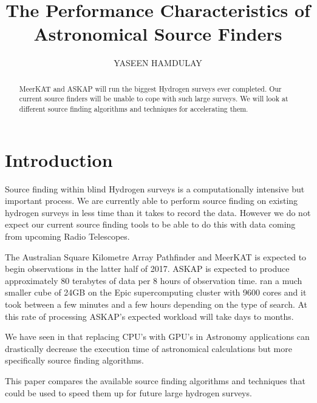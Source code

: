 \documentclass[prodmode,acmtecs]{acmsmall} \usepackage[ruled]{algorithm2e}
\begin{document}
\title{The Performance Characteristics of Astronomical Source Finders}
\author{YASEEN HAMDULAY
}

\begin{abstract}
MeerKAT and ASKAP will run the biggest Hydrogen surveys ever completed. Our current source
finders will be unable to cope with such large surveys. We will look at different source
finding algorithms and techniques for accelerating them.
\end{abstract}


\maketitle

\section{Introduction}
Source finding within blind Hydrogen surveys is a computationally intensive but important process.
We are currently able to perform source finding on existing hydrogen surveys in less time than it takes
to record the data. However we do not expect our current source finding tools to be able to do this with
data coming from upcoming Radio Telescopes. 

The Australian Square Kilometre Array Pathfinder and MeerKAT is expected to begin observations in the latter
half of 2017. ASKAP is expected to produce approximately 80 terabytes of data per 8 hours of 
observation time. \cite{whiting2012source} ran a much smaller cube of 24GB on the Epic supercomputing
cluster with 9600 cores and it took between a few minutes and a few hours depending on the
type of search. At this rate of processing ASKAP's expected workload will take days to months. 

We have seen in \cite{fluke2011astrophysical}\cite{westerlund2015performance} that replacing CPU's with GPU's in Astronomy applications
can drastically decrease the execution time of astronomical calculations but more specifically
source finding algorithms.

This paper compares the available source finding algorithms and techniques that could be used to speed
them up for future large hydrogen surveys. 
\cite{holwerda2010trumpeting}
\cite{whiting2012source}
\cite{floer2014source}
\end{document}
